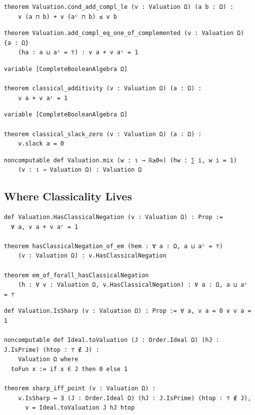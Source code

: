 \label{lean:cond-add-compl-le}
\begin{lstlisting}
theorem Valuation.cond_add_compl_le (v : Valuation Ω) (a b : Ω) :
    v (a ⊓ b) + v (aᶜ ⊓ b) ≤ v b
\end{lstlisting}

\label{lean:add-compl-eq-one-of-complemented}
\begin{lstlisting}
theorem Valuation.add_compl_eq_one_of_complemented (v : Valuation Ω) {a : Ω}
    (ha : a ⊔ aᶜ = ⊤) : v a + v aᶜ = 1
\end{lstlisting}

\label{lean:classical-additivity}
\begin{lstlisting}
variable [CompleteBooleanAlgebra Ω]

theorem classical_additivity (v : Valuation Ω) (a : Ω) :
    v a + v aᶜ = 1
\end{lstlisting}

\label{lean:classical-slack-zero}
\begin{lstlisting}
variable [CompleteBooleanAlgebra Ω]

theorem classical_slack_zero (v : Valuation Ω) (a : Ω) :
    v.slack a = 0
\end{lstlisting}

\label{lean:valuation-mix}
\begin{lstlisting}
noncomputable def Valuation.mix (w : ι → ℝ≥0∞) (hw : ∑ i, w i = 1)
    (v : ι → Valuation Ω) : Valuation Ω
\end{lstlisting}

\subsection{Where Classicality Lives}

\label{lean:hinge}
\begin{lstlisting}
def Valuation.HasClassicalNegation (v : Valuation Ω) : Prop :=
  ∀ a, v a + v aᶜ = 1

theorem hasClassicalNegation_of_em (hem : ∀ a : Ω, a ⊔ aᶜ = ⊤)
    (v : Valuation Ω) : v.HasClassicalNegation

theorem em_of_forall_hasClassicalNegation
    (h : ∀ v : Valuation Ω, v.HasClassicalNegation) : ∀ a : Ω, a ⊔ aᶜ = ⊤
\end{lstlisting}

\label{lean:sharp-iff-point}
\begin{lstlisting}
def Valuation.IsSharp (v : Valuation Ω) : Prop := ∀ a, v a = 0 ∨ v a = 1

noncomputable def Ideal.toValuation (J : Order.Ideal Ω) (hJ : J.IsPrime) (htop : ⊤ ∉ J) :
    Valuation Ω where
  toFun x := if x ∈ J then 0 else 1

theorem sharp_iff_point (v : Valuation Ω) :
    v.IsSharp ↔ ∃ (J : Order.Ideal Ω) (hJ : J.IsPrime) (htop : ⊤ ∉ J),
      v = Ideal.toValuation J hJ htop
\end{lstlisting}

